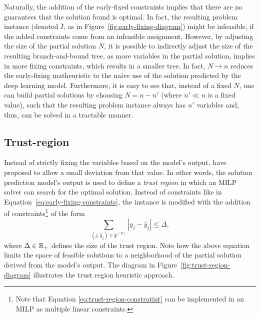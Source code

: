 Naturally, the addition of the early-fixed constraints implies that there are no guarantees that the solution found is optimal.
In fact, the resulting problem instance (denoted $\overline{I}$, as in Figure~\ref{fig:early-fixing-diagram}) might be infeasible, if the added constraints come from an infeasible assignment.
However, by adjusting the size of the partial solution $N$, it is possible to indirectly adjust the size of the resulting branch-and-bound tree, as more variables in the partial solution, implies in more fixing constraints, which results in a smaller tree. 
In fact, $N\to n$ reduces the early-fixing matheuristic to the naïve use of the solution predicted by the deep learning model.
Furthermore, it is easy to see that, instead of a fixed $N$, one can build partial solutions by choosing $N=n-n'$ (where $n' \ll n$ is a fixed value), such that the resulting problem instance always has $n'$ variables and, thus, can be solved in a tractable manner.


\subsection{Trust-region}

Instead of strictly fixing the variables based on the model's output,  have proposed to allow a small deviation from that value.
In other words, the solution prediction model's output is used to define a \emph{trust region} in which an MILP solver can search for the optimal solution.
Instead of constraints like in Equation~\eqref{eq:early-fixing-constraints}, the instance is modified with the addition of constraints\footnote{Note that Equation \eqref{eq:trust-region-constratint} can be implemented in an MILP as multiple linear constraints.} of the form
\begin{equation}\label{eq:trust-region-constraint}
    \sum_{(j,\hat{y}_j) \in \overline{\bm{y}}^{(N)}} |y_{j} - \hat{y}_j| \le \Delta
,\end{equation}
where $\Delta \in \mathbb{R}_+$ defines the size of the trust region.
Note how the above equation limits the space of feasible solutions to a neighborhood of the partial solution derived from the model's output.
The diagram in Figure~\ref{fig:trust-region-diagram} illustrates the trust region heuristic approach.

